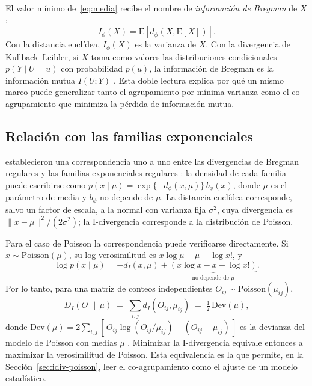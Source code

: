 El valor mínimo de~\eqref{eq:media} recibe el nombre de \emph{información de
Bregman} de $X$:
\begin{equation}\label{eq:info-bregman}
  I_\phi(X) = \mathrm{E}[d_\phi(X, \mathrm{E}[X])].
\end{equation}
Con la distancia euclídea, $I_\phi(X)$ es la varianza de $X$. Con la divergencia de
Kullback--Leibler, si $X$ toma como valores las distribuciones condicionales
$p(Y \mid U = u)$ con probabilidad $p(u)$, la información de Bregman es la
información mutua $I(U;Y)$ \cite{Banerjee2005}. Esta doble lectura explica por qué
un mismo marco puede generalizar tanto el agrupamiento por mínima varianza como el
co-agrupamiento que minimiza la pérdida de información mutua.

\subsection{Relación con las familias exponenciales}\label{sec:bregman-expfam}

\cite{Banerjee2005} establecieron una correspondencia uno a uno entre las
divergencias de Bregman regulares y las familias exponenciales regulares
\cite[Teoremas~4 y~6]{Banerjee2005}: la densidad de cada familia puede escribirse
como $p(x \mid \mu) = \exp\{-d_\phi(x, \mu)\}\, b_\phi(x)$, donde $\mu$ es el
parámetro de media y $b_\phi$ no depende de $\mu$. La distancia euclídea
corresponde, salvo un factor de escala, a la normal con varianza fija
$\sigma^2$, cuya divergencia es $\lVert x - \mu \rVert^2 / (2\sigma^2)$; la
I-divergencia corresponde a la distribución de Poisson.

Para el caso de Poisson la correspondencia puede verificarse directamente. Si
$x \sim \mathrm{Poisson}(\mu)$, su log-verosimilitud es
$x \log \mu - \mu - \log x!$, y
\begin{equation}
  \log p(x \mid \mu) = -d_I(x, \mu) + \underbrace{\left( x \log x - x - \log x! \right)}_{\text{no depende de } \mu}.
\end{equation}
Por lo tanto, para una matriz de conteos independientes $O_{ij} \sim
\mathrm{Poisson}(\mu_{ij})$,
\begin{equation}\label{eq:devianza}
  D_I(O \,\|\, \mu) \;=\; \sum_{i,j} d_I(O_{ij}, \mu_{ij}) \;=\; \tfrac{1}{2}\, \mathrm{Dev}(\mu),
\end{equation}
donde $\mathrm{Dev}(\mu) = 2 \sum_{i,j} [\, O_{ij} \log (O_{ij}/\mu_{ij}) - (O_{ij} - \mu_{ij}) \,]$
es la devianza del modelo de Poisson con medias $\mu$
\cite[Sec.~4.5.2, ec.~4.34]{Agresti2013}. Minimizar la I-divergencia equivale
entonces a maximizar la verosimilitud de Poisson. Esta equivalencia es la que
permite, en la Sección~\ref{sec:idiv-poisson}, leer el co-agrupamiento como el
ajuste de un modelo estadístico.

